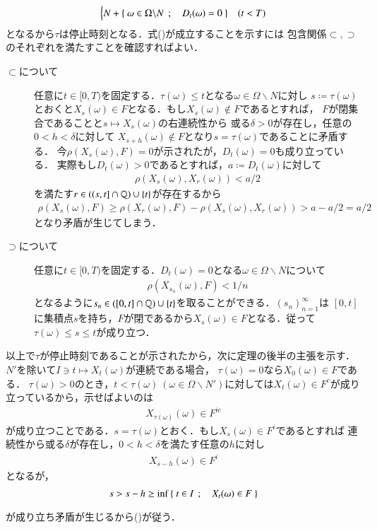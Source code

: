\begin{prf}
\begin{align}
\begin{cases}
				N + \left\{\ \omega \in \Omega \backslash N\ \, ; \quad D_t(\omega) = 0\ \right\} & (t < T)
 			\end{cases}
		\end{align}
		となるから$\tau$は停止時刻となる．式()が成立することを示すには
		包含関係$\subset,\supset$のそれぞれを満たすことを確認すればよい．
		\begin{description}
			\item[$\subset$について]
				任意に$t \in [0,T)$を固定する．$\tau(\omega) \leq t$となる$\omega \in \Omega \backslash N$に対し
				$s \coloneqq \tau(\omega)$とおくと$X_s(\omega) \in F$となる．もし$X_s(\omega) \notin F$であるとすれば，
				$F$が閉集合であることと$s \longmapsto X_s(\omega)$の右連続性から
				或る$\delta > 0$が存在し，任意の$0 < h < \delta$に対して
				$X_{s+h}(\omega) \notin F$となり$s = \tau(\omega)$であることに矛盾する．
				今$\rho(X_s(\omega),F) = 0$が示されたが，$D_t(\omega) = 0$も成り立っている．
				実際もし$D_t(\omega) > 0$であるとすれば，$a \coloneqq D_t(\omega)$に対して
				\begin{align}
					\rho(X_s(\omega), X_r(\omega)) < a/2
				\end{align}
				を満たす$r \in ((s,t] \cap \mathbb{Q}) \cup \{t\}$が存在するから
				\begin{align}
					\rho(X_s(\omega),F) \geq \rho(X_r(\omega),F) - \rho(X_s(\omega), X_r(\omega)) > a - a/2 = a/2
				\end{align}
				となり矛盾が生じてしまう．
			
			\item[$\supset$について]
				任意に$t \in [0,T)$を固定する．$D_t(\omega) = 0$となる$\omega \in \Omega \backslash N$について
				\begin{align}
					\rho(X_{s_n}(\omega),F) < 1/n
				\end{align}
				となるように$s_n \in ([0,t] \cap \mathbb{Q}) \cup \{t\}$を取ることができる．$(s_n)_{n=1}^{\infty}$は
				$[0,t]$に集積点$s$を持ち，$F$が閉であるから$X_s(\omega) \in F$となる．従って
				$\tau(\omega) \leq s \leq t$が成り立つ．
		\end{description}
		以上で$\tau$が停止時刻であることが示されたから，次に定理の後半の主張を示す．
		$N'$を除いて$I \ni t \longmapsto X_t(\omega)$が連続である場合，
		$\tau(\omega) = 0$なら$X_0(\omega) \in F$である．
		$\tau(\omega) > 0$のとき，$t < \tau(\omega)\ (\omega \in \Omega \backslash N')$に対しては$X_t(\omega) \in F^c$が成り立っているから，示せばよいのは
		\begin{align}
			X_{\tau(\omega)}(\omega) \in F^{ic}
			\label{eq:closed_set_stopping_time_2}
		\end{align}
		が成り立つことである．$s = \tau(\omega)$とおく．もし$X_s(\omega) \in F^i$であるとすれば
		連続性から或る$\delta$が存在し，$0 < h < \delta$を満たす任意の$h$に対し
		\begin{align}
			X_{s - h}(\omega) \in F^i
		\end{align}
		となるが，
		\begin{align}
			s > s - h \geq \operatorname*{inf}_{} \left\{\ t \in I\ \, ; \quad X_t(\omega) \in F\ \right\}
		\end{align}
		が成り立ち矛盾が生じるから()が従う．
		\QED
	\end{prf}
	